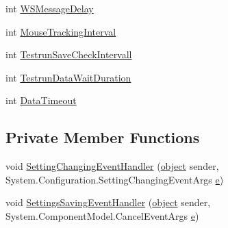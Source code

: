 \begin{DoxyCompactItemize}
\item 
int \hyperlink{class_web_analyzer_1_1_properties_1_1_settings_a62b7526a2c670219322da46a41f2ed4b}{W\+S\+Message\+Delay}
\item 
int \hyperlink{class_web_analyzer_1_1_properties_1_1_settings_adbf085e7ab78ddf4c493336d7c66c92a}{Mouse\+Tracking\+Interval}
\item 
int \hyperlink{class_web_analyzer_1_1_properties_1_1_settings_a3160d237b811df98aeb601487fa43943}{Testrun\+Save\+Check\+Intervall}
\item 
int \hyperlink{class_web_analyzer_1_1_properties_1_1_settings_a4fa938c23f07358746ab269d717fd087}{Testrun\+Data\+Wait\+Duration}
\item 
int \hyperlink{class_web_analyzer_1_1_properties_1_1_settings_a0c6ee531ecb7669be322d0b6adbbed8a}{Data\+Timeout}
\end{DoxyCompactItemize}
\subsection*{Private Member Functions}
\begin{DoxyCompactItemize}
\item 
void \hyperlink{class_web_analyzer_1_1_properties_1_1_settings_ade54623f5935cf04300ab15254d1a846}{Setting\+Changing\+Event\+Handler} (\hyperlink{_u_i_2_h_t_m_l_resources_2js_2lib_2underscore_8min_8js_aae18b7515bb2bc4137586506e7c0c903}{object} sender, System.\+Configuration.\+Setting\+Changing\+Event\+Args \hyperlink{_u_i_2_h_t_m_l_resources_2js_2lib_2bootstrap_8min_8js_ab5902775854a8b8440bcd25e0fe1c120}{e})
\item 
void \hyperlink{class_web_analyzer_1_1_properties_1_1_settings_a539f50459d03d0782e76117c5a3ed3eb}{Settings\+Saving\+Event\+Handler} (\hyperlink{_u_i_2_h_t_m_l_resources_2js_2lib_2underscore_8min_8js_aae18b7515bb2bc4137586506e7c0c903}{object} sender, System.\+Component\+Model.\+Cancel\+Event\+Args \hyperlink{_u_i_2_h_t_m_l_resources_2js_2lib_2bootstrap_8min_8js_ab5902775854a8b8440bcd25e0fe1c120}{e})
\end{DoxyCompactItemize}
